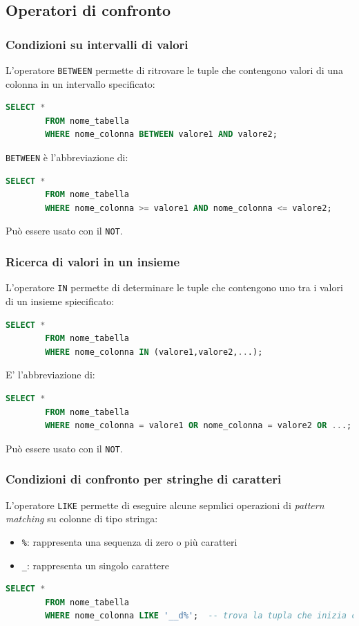 \documentclass[12pt, a4paper]{report}
\begin{document}
    \subsection{Operatori di confronto}
    \subsubsection{Condizioni su intervalli di valori}
    L'operatore \texttt{BETWEEN} permette di ritrovare le tuple che contengono valori di una colonna in un intervallo specificato:
    \begin{lstlisting}[language=SQL]
        SELECT *
        FROM nome_tabella
        WHERE nome_colonna BETWEEN valore1 AND valore2;
    \end{lstlisting}
    \texttt{BETWEEN} è l'abbreviazione di:
    \begin{lstlisting}[language=SQL]
        SELECT *
        FROM nome_tabella
        WHERE nome_colonna >= valore1 AND nome_colonna <= valore2;
    \end{lstlisting}
    Può essere usato con il \texttt{NOT}.
    \subsubsection{Ricerca di valori in un insieme}
    L'operatore \texttt{IN} permette di determinare le tuple che contengono uno tra i valori di un insieme spiecificato:
    \begin{lstlisting}[language=SQL]
        SELECT *
        FROM nome_tabella
        WHERE nome_colonna IN (valore1,valore2,...);
    \end{lstlisting}
    E' l'abbreviazione di:
    \begin{lstlisting}[language=SQL]
        SELECT *
        FROM nome_tabella
        WHERE nome_colonna = valore1 OR nome_colonna = valore2 OR ...;
    \end{lstlisting}
    Può essere usato con il \texttt{NOT}.
    \subsubsection{Condizioni di confronto per stringhe di caratteri}
    L'operatore \texttt{LIKE} permette di eseguire alcune sepmlici operazioni di \textit{pattern matching} su colonne di tipo stringa:
    \begin{itemize}
        \item \texttt{\%}: rappresenta una sequenza di zero o più caratteri
        \item \texttt{\_}: rappresenta un singolo carattere
    \end{itemize}
    \begin{lstlisting}[language=SQL]
        SELECT *
        FROM nome_tabella
        WHERE nome_colonna LIKE '__d%';  -- trova la tupla che inizia con due caratteri qualsiasi, seguita da 'd' e poi da zero o piu' caratteri
    \end{lstlisting}
\end{document}
